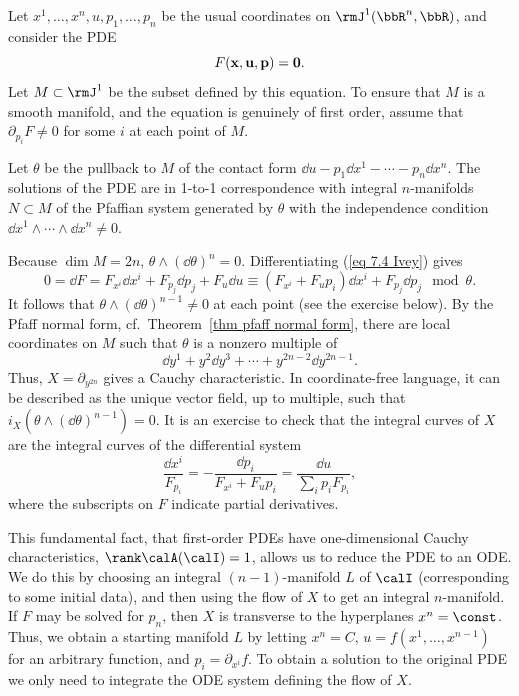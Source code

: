 \begin{example}
    Let $x^1,\ldots,x^n,u,p_1,\ldots,p_n$ be the usual coordinates on $\rmJ^1(\bbR^n,\bbR)$, and consider the PDE 
    \[F(\bf{x},u,\bf{p})=0.\label{eq 7.4 Ivey}\]
    Let $M\subset  \rmJ^1$ be the subset defined by this equation. To ensure that $M$ is a smooth manifold, and the equation is genuinely of first order, assume that $\partial_{p_i}F\neq 0$ for some $i$ at each point of $M$.

    Let $\theta$ be the pullback to $M$ of the contact form $\dd u-p_1\dd x^1-\cdots-p_n\dd x^n$. The solutions of the PDE are in 1-to-1 correspondence with integral $n$-manifolds $N\subset M$ of the Pfaffian system generated by $\theta$ with the independence condition $\dd x^1\wedge \cdots\wedge\dd x^n\neq 0$.

    Because $\dim M=2n$, $\theta\wedge (\dd\theta)^n=0$. Differentiating (\ref{eq 7.4 Ivey}) gives 
    \[0=\dd F=F_{x^i}\dd x^i+F_{p_j}\dd p_j+F_u\dd u\equiv (F_{x^i}+F_up_i)\dd x^i+F_{p_j}\dd p_j\mod\theta.\]
    It follows that $\theta\wedge (\dd\theta)^{n-1}\neq 0$ at each point (see the exercise below). By the Pfaff normal form, cf.\ Theorem~\ref{thm pfaff normal form}, there are local coordinates on $M$ such that $\theta$ is a nonzero multiple of 
    \[\dd y^1+y^2\dd y^3+\cdots +y^{2n-2}\dd y^{2n-1}.\label{eq 7.5 Ivey}\]
    Thus, $X=\partial_{y^{2n}}$ gives a Cauchy characteristic. In coordinate-free language, it can be described as the unique vector field, up to multiple, such that $i_X(\theta\wedge(\dd\theta)^{n-1})=0$. It is an exercise to check that the integral curves of $X$ are the integral curves of the differential system 
    \[\frac{\dd x^i}{F_{p_i}}=-\frac{\dd p_i}{F_{x^i}+F_u p_i}=\frac{\dd u}{\sum_i p_i F_{p_i}},\label{eq 14 Bryant}\]
    where the subscripts on $F$ indicate partial derivatives.

    This fundamental fact, that first-order PDEs have one-dimensional Cauchy characteristics, $\rank \calA(\calI)=1$, allows us to reduce the PDE to an ODE. We do this by choosing an integral $(n-1)$-manifold $L$ of $\calI$ (corresponding to some initial data), and then using the flow of $X$ to get an integral $n$-manifold. If $F$ may be solved for $p_n$, then $X$ is transverse to the hyperplanes $x^n=\const$. Thus, we obtain a starting manifold $L$ by letting $x^n=C$, $u=f(x^1,\ldots,x^{n-1})$ for an arbitrary function, and $p_i=\partial_{x^i}f$. To obtain a solution to the original PDE we only need to integrate the ODE system defining the flow of $X$.
\end{example}

